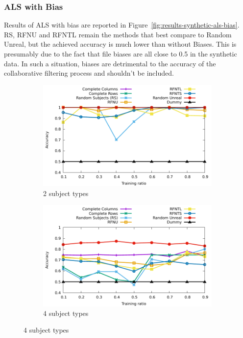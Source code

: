 \documentclass[10pt, conference, compsocconf]{IEEEtran}
\begin{document}
\subsubsection{ALS with Bias}

Results of ALS with bias are reported in 
Figure~\ref{fig:results-synthetic-als-bias}. RS, RFNU and RFNTL remain 
the methods that best compare to Random Unreal, but the achieved 
accuracy is much lower than without Biases. This is presumably due to 
the fact that file biases are all close to 0.5 in the synthetic data. 
In such a situation, biases are detrimental to the accuracy of the 
collaborative filtering process and shouldn't be included.

\begin{figure}
\begin{subfigure}[b]{\columnwidth}
        \includegraphics[width=0.8\columnwidth]{data/results/means_of_results/ALS-Bias/Synthetic/synthetic_subject_types/ALS-Bias-2-types.pdf}
        \caption{2 subject types}
\end{subfigure}
\begin{subfigure}[b]{\columnwidth}
        \includegraphics[width=0.8\columnwidth]{data/results/means_of_results/ALS-Bias/Synthetic/synthetic_subject_types/ALS-Bias-4-types.pdf}
        \caption{4 subject types}
\end{subfigure}

\end{figure}
\end{document}

